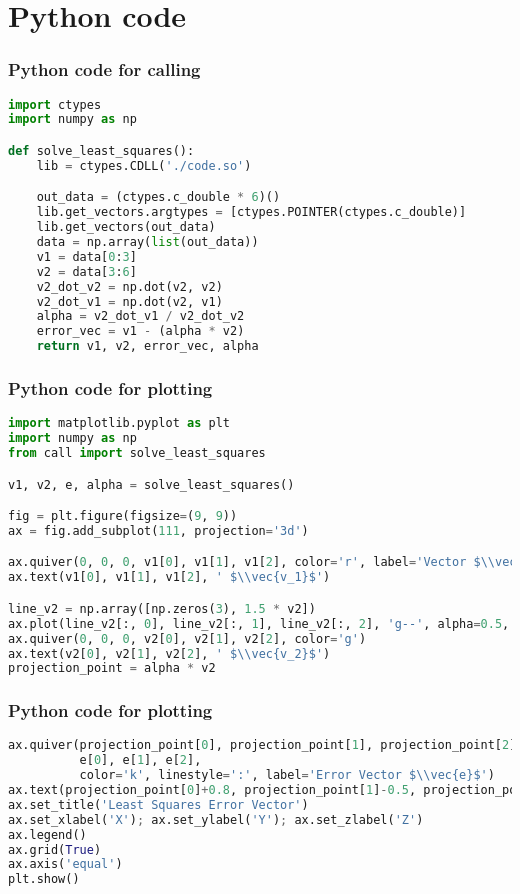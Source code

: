 \documentclass{beamer}
\theoremstyle{remark}
\let\vec\mathbf
\numberwithin{equation}{section}
\begin{document}
\section{Python code}
 \begin{frame}[fragile]
\frametitle{Python code for calling }
\begin{lstlisting}[language=Python]
import ctypes
import numpy as np

def solve_least_squares():
    lib = ctypes.CDLL('./code.so')

    out_data = (ctypes.c_double * 6)()
    lib.get_vectors.argtypes = [ctypes.POINTER(ctypes.c_double)]
    lib.get_vectors(out_data)
    data = np.array(list(out_data))
    v1 = data[0:3]
    v2 = data[3:6]
    v2_dot_v2 = np.dot(v2, v2)
    v2_dot_v1 = np.dot(v2, v1)
    alpha = v2_dot_v1 / v2_dot_v2
    error_vec = v1 - (alpha * v2)
    return v1, v2, error_vec, alpha
\end{lstlisting}
\end{frame}
 \begin{frame}[fragile]
\frametitle{Python code for plotting }
\begin{lstlisting}[language=Python]
import matplotlib.pyplot as plt
import numpy as np
from call import solve_least_squares

v1, v2, e, alpha = solve_least_squares()

fig = plt.figure(figsize=(9, 9))
ax = fig.add_subplot(111, projection='3d')

ax.quiver(0, 0, 0, v1[0], v1[1], v1[2], color='r', label='Vector $\\vec{v_1}$')
ax.text(v1[0], v1[1], v1[2], ' $\\vec{v_1}$')

line_v2 = np.array([np.zeros(3), 1.5 * v2])
ax.plot(line_v2[:, 0], line_v2[:, 1], line_v2[:, 2], 'g--', alpha=0.5, label='Line of $\\vec{v_2}$')
ax.quiver(0, 0, 0, v2[0], v2[1], v2[2], color='g')
ax.text(v2[0], v2[1], v2[2], ' $\\vec{v_2}$')
projection_point = alpha * v2
\end{lstlisting}
\end{frame}
 \begin{frame}[fragile]
\frametitle{Python code for plotting }
\begin{lstlisting}[language=Python]
ax.quiver(projection_point[0], projection_point[1], projection_point[2],
          e[0], e[1], e[2],
          color='k', linestyle=':', label='Error Vector $\\vec{e}$')
ax.text(projection_point[0]+0.8, projection_point[1]-0.5, projection_point[2]+0.5, '$\\vec{e}$')
ax.set_title('Least Squares Error Vector')
ax.set_xlabel('X'); ax.set_ylabel('Y'); ax.set_zlabel('Z')
ax.legend()
ax.grid(True)
ax.axis('equal')
plt.show()

\end{lstlisting}
\end{frame}
\end{document}
